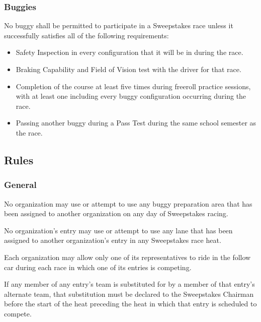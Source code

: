 \subsubsection{Buggies}

	No buggy shall be permitted to participate in a Sweepstakes race unless it
	successfully satisfies all of the following requirements:

	\begin{itemize}

		\item Safety Inspection in every configuration that it will be in during the race.

		\item Braking Capability and Field of Vision test with the driver for that race.
		
		\item Completion of the course at least five times during freeroll practice sessions, with at least one including every buggy configuration occurring during the race.

		\item Passing another buggy during a Pass Test during the same school semester as the race.

	\end{itemize}

\subsection{Rules}

\subsubsection{General}

	No organization may use or attempt to use any buggy preparation area that has
	been assigned to another organization on any day of Sweepstakes racing.

	No organization's entry may use or attempt to use any lane that has been
	assigned to another organization's entry in any Sweepstakes race heat.

	Each organization may allow only one of its representatives to ride in the
	follow car during each race in which one of its entries is competing.

	If any member of any entry's team is substituted for by a member of that
	entry's alternate team, that substitution must be declared to the Sweepstakes
	Chairman before the start of the heat preceding the heat in which that entry is
	scheduled to compete.

